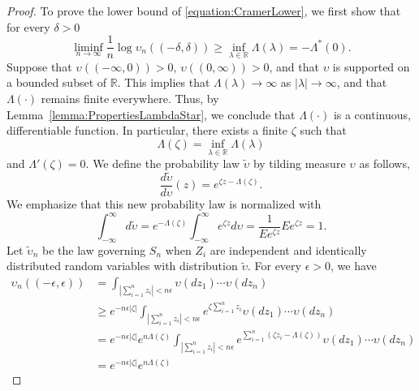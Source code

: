 \begin{proof}
To prove the lower bound of \eqref{equation:CramerLower}, we first show that for every $\delta > 0$
\begin{equation} \label{equation:CramerCenteredLower}
\liminf_{n \rightarrow \infty} \frac{1}{n} \log \upsilon_n ((- \delta, \delta))
\geq \inf_{\lambda \in \mathbb{R}} \Lambda (\lambda) = - \Lambda^*(0) .
\end{equation}
Suppose that $\upsilon ((- \infty, 0)) > 0$, $\upsilon ((0, \infty)) > 0$, and that $\upsilon$ is supported on a bounded subset of $\mathbb{R}$.
This implies that $\Lambda (\lambda) \rightarrow \infty$ as $|\lambda| \rightarrow \infty$, and that $\Lambda (\cdot)$ remains finite everywhere.
Thus, by Lemma~\ref{lemma:PropertiesLambdaStar}, we conclude that $\Lambda (\cdot)$ is a continuous, differentiable function.
In particular, there exists a finite $\zeta$ such that
\begin{equation*}
\Lambda(\zeta) = \inf_{\lambda \in \mathbb{R}} \Lambda (\lambda)
\end{equation*}
and $\Lambda'(\zeta) = 0$.
We define the probability law $\tilde{\upsilon}$ by tilding measure $\upsilon$ as follows,
\begin{equation*}
\frac{d \tilde{\upsilon}}{d \upsilon} (z) = e^{\zeta z - \Lambda(\zeta)} .
\end{equation*}
We emphasize that this new probability law is normalized with
\begin{equation*}
\int_{-\infty}^{\infty} d \tilde{\upsilon}
= e^{- \Lambda(\zeta)} \int_{-\infty}^{\infty} e^{\zeta z} d\upsilon
= \frac{1}{E e^{\zeta z}} E e^{\zeta z} = 1 .
\end{equation*}
Let $\tilde{\upsilon}_n$ be the law governing $S_n$ when $Z_i$ are independent and identically distributed random variables with distribution $\tilde{\upsilon}$.
For every $\epsilon > 0$, we have
\begin{equation*}
\begin{split}
\upsilon_n ((- \epsilon, \epsilon))
&= \int_{\left| \sum_{i=1}^n z_i \right| < n \epsilon}
\upsilon(dz_1) \cdots \upsilon (dz_n) \\
&\geq e^{- n \epsilon | \zeta |} \int_{\left| \sum_{i=1}^n z_i \right| < n \epsilon}
e^{\zeta \sum_{i=1}^n z_i} \upsilon(dz_1) \cdots \upsilon (dz_n) \\
&= e^{- n \epsilon | \zeta |} e^{n \Lambda(\zeta)}
\int_{\left| \sum_{i=1}^n z_i \right| < n \epsilon}
e^{\sum_{i=1}^n (\zeta z_i - \Lambda(\zeta))} \upsilon(dz_1) \cdots \upsilon (dz_n) \\
&= e^{- n \epsilon | \zeta |} e^{n \Lambda(\zeta)}

\end{split}
\end{equation*}
\end{proof}
